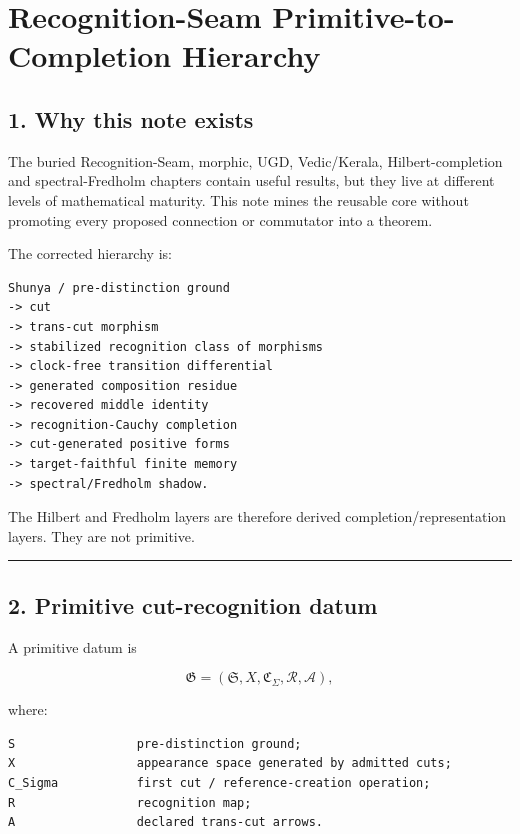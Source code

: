 \hypertarget{recognition-seam-primitive-to-completion-hierarchy}{%
\chapter{Recognition-Seam Primitive-to-Completion Hierarchy}\label{recognition-seam-primitive-to-completion-hierarchy}}

\hypertarget{why-this-note-exists}{%
\section{1. Why this note exists}\label{why-this-note-exists}}

The buried Recognition-Seam, morphic, UGD, Vedic/Kerala, Hilbert-completion and
spectral-Fredholm chapters contain useful results, but they live at different
levels of mathematical maturity. This note mines the reusable core without
promoting every proposed connection or commutator into a theorem.

The corrected hierarchy is:

\begin{verbatim}
Shunya / pre-distinction ground
-> cut
-> trans-cut morphism
-> stabilized recognition class of morphisms
-> clock-free transition differential
-> generated composition residue
-> recovered middle identity
-> recognition-Cauchy completion
-> cut-generated positive forms
-> target-faithful finite memory
-> spectral/Fredholm shadow.
\end{verbatim}

The Hilbert and Fredholm layers are therefore derived completion/representation
layers. They are not primitive.

\begin{center}\rule{0.5\linewidth}{0.5pt}\end{center}

\hypertarget{primitive-cut-recognition-datum}{%
\section{2. Primitive cut-recognition datum}\label{primitive-cut-recognition-datum}}

A primitive datum is

\[
\mathfrak G=(\mathfrak S,X,\mathfrak C_\Sigma,\mathcal R,\mathcal A),
\]

where:

\begin{verbatim}
S                 pre-distinction ground;
X                 appearance space generated by admitted cuts;
C_Sigma           first cut / reference-creation operation;
R                 recognition map;
A                 declared trans-cut arrows.
\end{verbatim}


